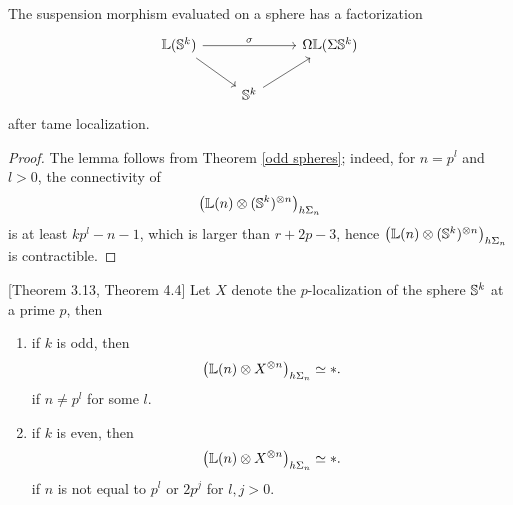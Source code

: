  
 \begin{lemma}
 	The suspension morphism evaluated on a sphere has a factorization
\[
\begin{tikzcd}
	 \BL(\BS^{k}) &   &  \Omega \BL (\Sigma \BS^{k})\\
	& \BS^{k}  &
	\arrow[from=1-1, to = 1-3, "\sigma"]
	\arrow[from=1-1 , to =2-2]
	\arrow[from=2-2, to=1-3]
\end{tikzcd}
\]
after tame localization.
\end{lemma}
\begin{proof}
	The lemma follows from Theorem \ref{odd spheres}; indeed, for $n=p^l$ and $l>0$, the connectivity of
	\[
	\big(
	{\mathbb{L}}(n)\otimes ({\mathbb{S}}^{k})^{\otimes n}
	\big)_{h\Sigma_n}
	\]
	is at least $kp^l-n-1$, which is larger than $r+2p-3$, hence 
	$\big(
	{\mathbb{L}}(n)\otimes ({\mathbb{S}}^{k})^{\otimes n}
	\big)_{h\Sigma_n}$ is contractible.
	
	\end{proof}
 \begin{theorem}
 	\cite{Arone-Mahowald}[Theorem 3.13, Theorem 4.4]
 	\label{odd spheres}
 	Let $X$ denote the $p$-localization of the sphere ${\mathbb{S}}^k$ at a prime $p$, then
 	\begin{enumerate}
 		\item if $k$ is odd, then 
 			$$
 			\big({\mathbb{L}}(n)\otimes X^{\otimes n}
 			\big)_{h\Sigma_n}
 			\simeq *.
 			$$
 			if $n\neq p^l$ for some $l$.
 		\item if $k$ is even, then 
 			$$
 			\big({\mathbb{L}}(n)\otimes X^{\otimes n}
 			\big)_{h\Sigma_n}
 			\simeq *.
 			$$
 			if $n$ is not equal to $p^l$ or $2p^j$ for $l, j>0$.
 	\end{enumerate} 	
 \end{theorem}
 
